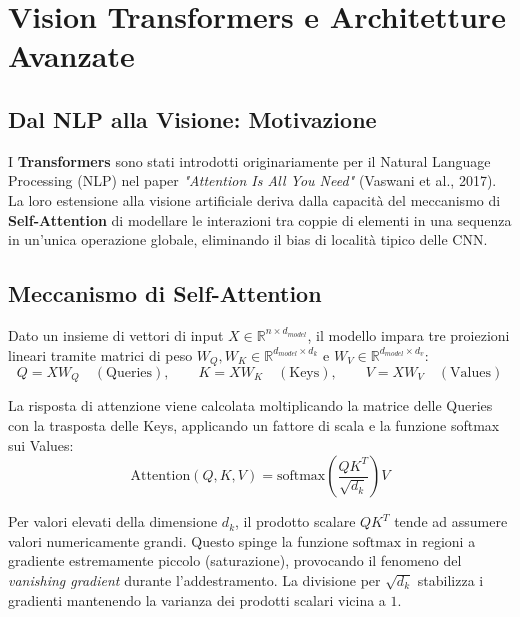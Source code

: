 \documentclass[12pt, a4paper]{report}
\newcommand{\R}{\mathbb{R}}
\begin{document}
\chapter{Vision Transformers e Architetture Avanzate}

\section{Dal NLP alla Visione: Motivazione}

I \textbf{Transformers} sono stati introdotti originariamente per il Natural Language
Processing (NLP) nel paper \emph{"Attention Is All You Need"} (Vaswani et al., 2017).
La loro estensione alla visione artificiale deriva dalla capacità del meccanismo di
\textbf{Self-Attention} di modellare le interazioni tra coppie di elementi in una
sequenza in un'unica operazione globale, eliminando il bias di località tipico delle CNN.

\section{Meccanismo di Self-Attention}

Dato un insieme di vettori di input $X \in \R^{n \times d_{model}}$, il modello impara
tre proiezioni lineari tramite matrici di peso $W_Q, W_K \in \R^{d_{model} \times d_k}$
e $W_V \in \R^{d_{model} \times d_v}$:
\[
  Q = X W_Q \quad (\text{Queries}), \qquad
  K = X W_K \quad (\text{Keys}), \qquad
  V = X W_V \quad (\text{Values})
\]

\begin{defbox}
La risposta di attenzione viene calcolata moltiplicando la matrice delle Queries con
la trasposta delle Keys, applicando un fattore di scala e la funzione softmax sui
Values:
\[
  \mathrm{Attention}(Q, K, V) = \mathrm{softmax}\left(\frac{Q K^T}{\sqrt{d_k}}\right) V
\]
\end{defbox}

\begin{notebox}
Per valori elevati della dimensione $d_k$, il prodotto scalare $Q K^T$ tende ad
assumere valori numericamente grandi. Questo spinge la funzione $\mathrm{softmax}$ in
regioni a gradiente estremamente piccolo (saturazione), provocando il fenomeno del
\emph{vanishing gradient} durante l'addestramento. La divisione per $\sqrt{d_k}$
stabilizza i gradienti mantenendo la varianza dei prodotti scalari vicina a $1$.
\end{notebox}
\end{document}
